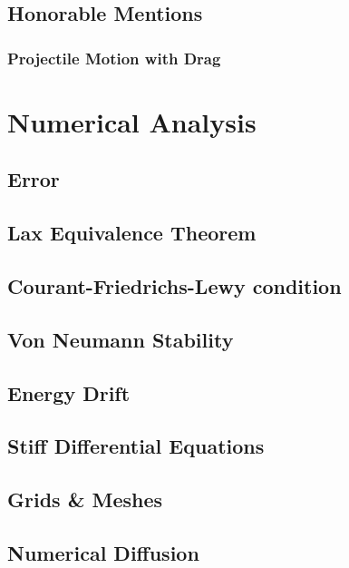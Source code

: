 \documentclass{report}
\begin{document}
    \section{Honorable Mentions}

        \subsection{Projectile Motion with Drag}

\chapter{Numerical Analysis}
    
    \section{Error}

    \section{Lax Equivalence Theorem}

    \section{Courant-Friedrichs-Lewy condition}

    \section{Von Neumann Stability}

    \section{Energy Drift}

    \section{Stiff Differential Equations}

    \section{Grids \& Meshes}

    \section{Numerical Diffusion}

\newpage

\printbibliography
\end{document}
